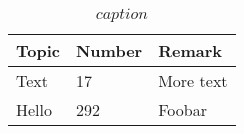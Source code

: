 
\begin{table}%
\centering
\begin{tabular}{p{5cm}| p{2cm} | p{8.5cm}}
\textbf{Topic} & \textbf{Number} & \textbf{Remark} \\
\hline \hline %
Text &
17 & 
More text
\\ \hline %
Hello & 
292 &
Foobar
\\ \hline
\end{tabular}
\caption{$caption$}
\label{tab:$label$}
\end{table}
